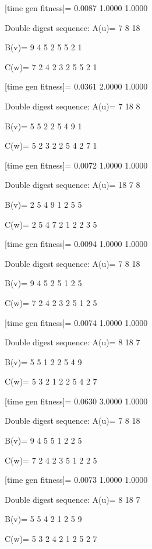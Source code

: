 [time gen fitness]=
    0.0087    1.0000    1.0000

Double digest sequence:
A(u)=
     7     8    18

B(v)=
     9     4     5     2     5     5     2     1

C(w)=
     7     2     4     2     3     2     5     5     2     1

[time gen fitness]=
    0.0361    2.0000    1.0000

Double digest sequence:
A(u)=
     7    18     8

B(v)=
     5     5     2     2     5     4     9     1

C(w)=
     5     2     3     2     2     5     4     2     7     1

[time gen fitness]=
    0.0072    1.0000    1.0000

Double digest sequence:
A(u)=
    18     7     8

B(v)=
     2     5     4     9     1     2     5     5

C(w)=
     2     5     4     7     2     1     2     2     3     5

[time gen fitness]=
    0.0094    1.0000    1.0000

Double digest sequence:
A(u)=
     7     8    18

B(v)=
     9     4     5     2     5     1     2     5

C(w)=
     7     2     4     2     3     2     5     1     2     5

[time gen fitness]=
    0.0074    1.0000    1.0000

Double digest sequence:
A(u)=
     8    18     7

B(v)=
     5     5     1     2     2     5     4     9

C(w)=
     5     3     2     1     2     2     5     4     2     7

[time gen fitness]=
    0.0630    3.0000    1.0000

Double digest sequence:
A(u)=
     7     8    18

B(v)=
     9     4     5     5     1     2     2     5

C(w)=
     7     2     4     2     3     5     1     2     2     5

[time gen fitness]=
    0.0073    1.0000    1.0000

Double digest sequence:
A(u)=
     8    18     7

B(v)=
     5     5     4     2     1     2     5     9

C(w)=
     5     3     2     4     2     1     2     5     2     7

